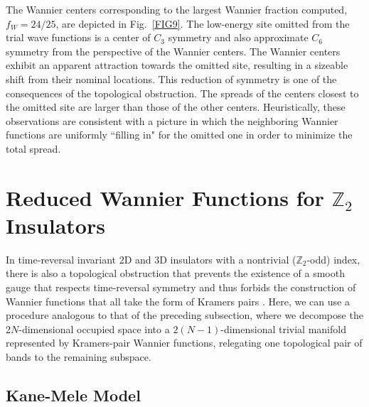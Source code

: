\documentclass[galley,aps,pra,10pt,amsmath,amssymb,
    superscriptaddress,nofootinbib,longbibliography]{revtex4-2}
\begin{document}
The Wannier centers corresponding to the largest Wannier fraction computed, $f_W = 24/25$, are depicted in Fig.~\ref{FIG9}. The low-energy site omitted from the trial wave functions is a center of $C_3$ symmetry and also approximate $C_6$ symmetry from the perspective of the Wannier centers. The Wannier centers exhibit an apparent attraction towards the omitted site, resulting in a sizeable shift from their nominal locations. This reduction of symmetry is one of the consequences of the topological obstruction. The spreads of the centers closest to the omitted site are larger than those of the other centers. Heuristically, these observations are consistent with a picture in which the neighboring Wannier functions are uniformly ``filling in" for the omitted one in order to minimize the total spread.  


\section{Reduced Wannier Functions for $\mathbb{Z}_2$ Insulators}
\label{redwf_Z2}


In time-reversal invariant 2D and 3D insulators with a nontrivial ($\mathbb{Z}_2$-odd) index, there is also a topological obstruction that prevents the existence of a smooth gauge that respects time-reversal symmetry and thus forbids the construction of Wannier functions that all take the form of Kramers pairs \cite{soluyanov2011}. Here, we can use a procedure analogous to that of the preceding subsection, where we decompose the 2$N$-dimensional occupied space into a $2(N\!-\!1)$-dimensional trivial manifold represented by Kramers-pair Wannier functions, relegating one topological pair of bands to the remaining subspace.

\subsection{Kane-Mele Model}
\end{document}
